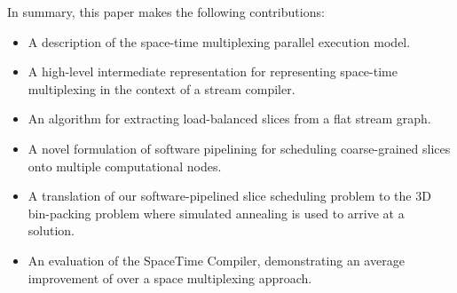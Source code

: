 
In summary, this paper makes the following contributions:

\begin{itemize}
\vspace{-6pt}
\item A description of the space-time multiplexing parallel execution
model.
\vspace{-6pt}
\item A high-level intermediate representation for representing
space-time multiplexing in the context of a stream compiler.  
\vspace{-6pt}
\item An algorithm for extracting load-balanced slices from a flat
stream graph.
\vspace{-6pt}
\item A novel formulation of software pipelining for scheduling
coarse-grained slices onto multiple computational nodes.
\vspace{-6pt}
\item A translation of our software-pipelined slice scheduling problem
to the 3D bin-packing problem where simulated annealing is used to
arrive at a solution.
\vspace{-6pt}
\item An evaluation of the SpaceTime Compiler, 
demonstrating an average improvement of  over a space
multiplexing approach.
\vspace{-6pt}
\end{itemize}



